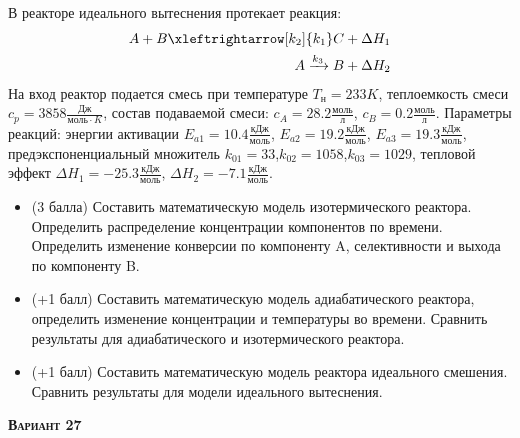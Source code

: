  В реакторе идеального вытеснения протекает реакция: \begin{equation*} \begin{aligned} A+B \xleftrightarrow[k_2]{k_1} C +\Delta H_1 \\ A \xrightarrow{k_3} B + \Delta H_2 \end{aligned} \end{equation*}                                     На вход  реактор подается смесь при температуре $ T_н =  233 K$, теплоемкость смеси $c_p= 3858 \frac{Дж}{моль \cdot K}$, состав подаваемой смеси: $c_A=28.2 \frac{моль}{л}$, $c_B=0.2 \frac{моль}{л}$. Параметры реакций: энергии активации $E_{a1}=10.4 \frac{кДж}{моль}$, $E_{a2}=19.2  \frac{кДж}{моль}$, $E_{a3}=19.3  \frac{кДж}{моль}$, предэкспоненциальный множитель $k_{01}=        33$,$k_{02}=      1058$,$k_{03}=      1029$, тепловой эффект $\Delta H_1= -25.3  \frac{кДж}{моль}$, $\Delta H_2=-7.1 \frac{кДж}{моль}$.\begin{itemize} \item (3 балла) Составить математическую модель изотермического реактора. Определить распределение концентрации компонентов по времени. Определить изменение конверсии по компоненту A, селективности и выхода по компоненту B. \item (+1 балл) Составить математическую модель адиабатического реактора, определить изменение концентрации и температуры во времени. Сравнить результаты для адиабатического и изотермического реактора. \item (+1 балл) Составить математическую модель реактора идеального смешения. Сравнить результаты для модели идеального вытеснения. \end{itemize}

\textsc{\textbf{Вариант 27}}

